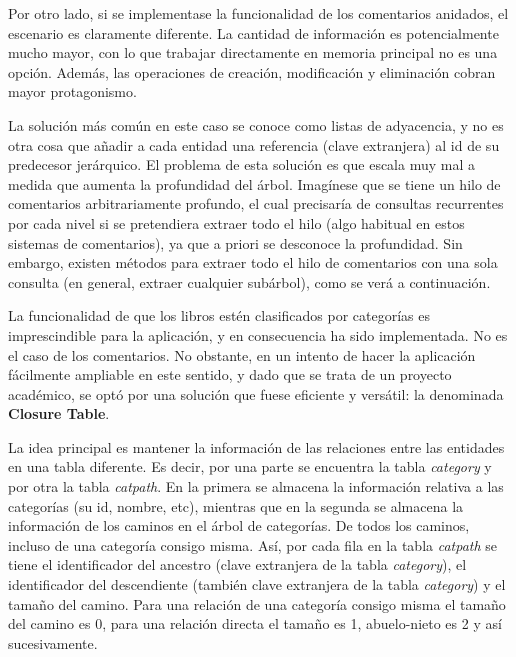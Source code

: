 \documentclass[a4paper]{article}
\begin{document}
    Por otro lado, si se implementase la funcionalidad de los comentarios anidados, el escenario es claramente diferente. La cantidad de información es potencialmente mucho mayor, con lo que trabajar directamente en memoria principal no es una opción. Además, las operaciones de creación, modificación y eliminación cobran mayor protagonismo.
    
    La solución más común en este caso se conoce como listas de adyacencia, y no es otra cosa que añadir a cada entidad una referencia (clave extranjera) al id de su predecesor jerárquico. El problema de esta solución es que escala muy mal a medida que aumenta la profundidad del árbol. Imagínese que se tiene un hilo de comentarios arbitrariamente profundo, el cual precisaría de consultas recurrentes por cada nivel si se pretendiera extraer todo el hilo (algo habitual en estos sistemas de comentarios), ya que a priori se desconoce la profundidad. Sin embargo, existen métodos para extraer todo el hilo de comentarios con una sola consulta (en general, extraer cualquier subárbol), como se verá a continuación.
    
    La funcionalidad de que los libros estén clasificados por categorías es imprescindible para la aplicación, y en consecuencia ha sido implementada. No es el caso de los comentarios. No obstante, en un intento de hacer la aplicación fácilmente ampliable en este sentido, y dado que se trata de un proyecto académico, se optó por una solución que fuese eficiente y versátil: la denominada \textbf{Closure Table}.
    
    La idea principal es mantener la información de las relaciones entre las entidades en una tabla diferente. Es decir, por una parte se encuentra la tabla \emph{category} y por otra la tabla \emph{catpath}. En la primera se almacena la información relativa a las categorías (su id, nombre, etc), mientras que en la segunda se almacena la información de los caminos en el árbol de categorías. De todos los caminos, incluso de una categoría consigo misma. Así, por cada fila en la tabla \emph{catpath} se tiene el identificador del ancestro (clave extranjera de la tabla \emph{category}), el identificador del descendiente (también clave extranjera de la tabla \emph{category}) y el tamaño del camino. Para una relación de una categoría consigo misma el tamaño del camino es 0, para una relación directa el tamaño es 1, abuelo-nieto es 2 y así sucesivamente.
    
\end{document}
